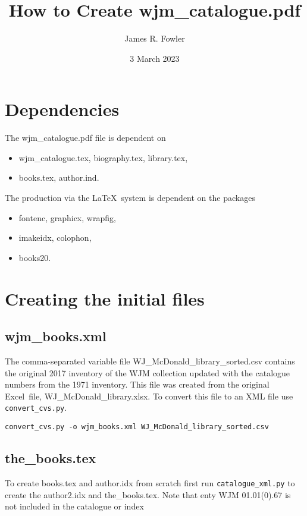 \documentclass{article}
\begin{document}
\title{How to Create wjm\_catalogue.pdf}
\author{James R. Fowler}
\date{3 March 2023}

\maketitle

\section{Dependencies}

The wjm\_catalogue.pdf file is dependent on
\begin{itemize}
  \item wjm\_catalogue.tex, biography.tex, library.tex,
  \item books.tex, author.ind.
\end{itemize}

\noindent
The production via the \LaTeX\ system is dependent on the packages
\begin{itemize}
  \item fontenc, graphicx, wrapfig,
  \item imakeidx, colophon,
  \item books20.
\end{itemize}


\section{Creating the initial files}

\subsection{wjm\_books.xml}
The comma-separated variable file WJ\_McDonald\_library\_sorted.csv
contains the original 2017 inventory of the WJM collection updated
with the catalogue numbers from the 1971 inventory.  This file was
created from the original Excel\textsuperscript{\texttrademark}\ file,
WJ\_McDonald\_library.xlsx.
To convert this file to an XML file use \texttt{convert\_cvs.py}.
\begin{verbatim}
convert_cvs.py -o wjm_books.xml WJ_McDonald_library_sorted.csv
\end{verbatim}

\subsection{the\_books.tex}
To create books.tex and author.idx from scratch first run
\texttt{catalogue\_xml.py} to create the author2.idx and
the\_books.tex. Note that enty WJM 01.01(0).67 is not included
in the catalogue or index
\end{document}
